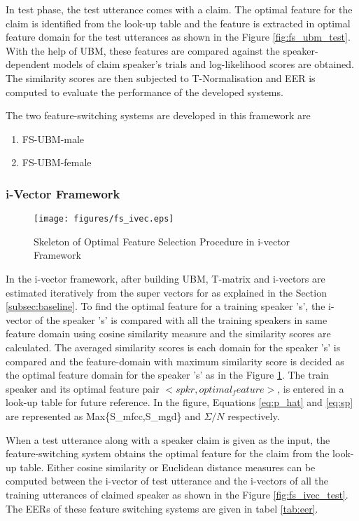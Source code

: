 \documentclass{article}
\begin{document}
In test phase, the test utterance comes with a claim. The optimal feature for the claim is identified from the look-up table and the feature is extracted in optimal feature domain for the test utterances as shown in the Figure \ref{fig:fs_ubm_test}. With the help of UBM, these features are compared against the speaker-dependent models of claim speaker's trials and log-likelihood scores are obtained. The similarity scores are then subjected to T-Normalisation and EER is computed to evaluate the performance of the developed systems. 

The two feature-switching systems are developed in this framework are
\begin{enumerate}
\item FS-UBM-male 
\item FS-UBM-female
\end{enumerate}


\subsubsection{i-Vector Framework}
\label{subsubsec:fs_ivec} 

\begin{figure}[h!tb]
\texttt{[image: figures/fs\_ivec.eps]}
\caption{Skeleton of Optimal Feature Selection Procedure in i-vector Framework}
\label{fig:fs_ivec}
\end{figure}

In the i-vector framework, after building UBM, T-matrix and i-vectors are estimated iteratively from the super vectors for  as explained in the Section \ref{subsec:baseline}. To find the optimal feature for a training speaker 's', the i-vector of the speaker 's' is compared with all the training speakers in same feature domain using cosine similarity measure and the similarity scores are calculated. The averaged similarity scores is each domain for the speaker 's' is compared and the feature-domain with maximum similarity score is decided as the optimal feature domain for the speaker 's' as in the Figure \ref{fig:fs_ivec}. The train speaker and its optimal feature pair $<spkr, optimal_feature>$, is entered in a look-up table for future reference. In the figure, Equations \ref{eq:p_hat} and \ref{eq:sp} are represented as Max\{S\_mfcc,S\_mgd\} and $\Sigma/N$ respectively.

When a test utterance along with a speaker claim is given as the input, the feature-switching system obtains the optimal feature for the claim from the look-up table. Either cosine similarity or Euclidean distance measures can be computed between the i-vector of test utterance and the i-vectors of all the training utterances of claimed speaker as shown in the Figure \ref{fig:fs_ivec_test}. The EERs of these feature switching systems are given in tabel \ref{tab:eer}.
\end{document}
